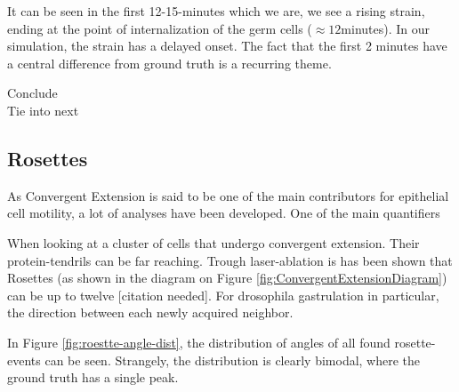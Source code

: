 It can be seen in the first 12-15-minutes which we are, we see a rising strain, ending at the point of internalization of the germ cells ($\approx12$minutes). In our simulation, the strain has a delayed onset. The fact that the first 2 minutes have a central difference from ground truth is a recurring theme.

Conclude\\

Tie into next

\subsection{Rosettes}
As Convergent Extension is said to be one of the main contributors for epithelial cell motility, a lot of analyses have been developed. 
One of the main quantifiers 

When looking at a cluster of cells that undergo convergent extension. Their protein-tendrils can be far reaching. Trough laser-ablation is has been shown that Rosettes (as shown in the diagram on Figure \ref{fig:ConvergentExtensionDiagram}) can be up to twelve [citation needed].
For drosophila gastrulation in particular, the direction between each newly acquired neighbor.




In Figure \ref{fig:roestte-angle-dist}, the distribution of angles of all found rosette-events can be seen. Strangely, the distribution is clearly bimodal, where the ground truth has a single peak.


